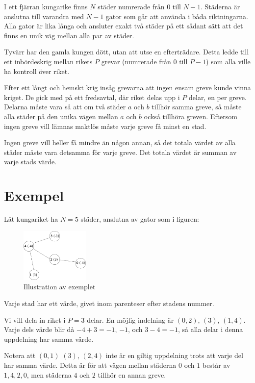 \newcommand\version{v2}
I ett fjärran kungarike finns $N$ städer numrerade från $0$ till $N-1$.
Städerna är anslutna till varandra med $N-1$ gator som går att använda i båda riktningarna.
Alla gator är lika långa och ansluter exakt två städer på ett sådant sätt att det finns en unik väg mellan alla par av städer.

Tyvärr har den gamla kungen dött, utan att utse en efterträdare. Detta ledde till ett inbördeskrig mellan rikets $P$ grevar (numrerade från $0$ till $P - 1$) som alla ville ha kontroll över riket.

Efter ett långt och hemskt krig insåg grevarna att ingen ensam greve kunde vinna kriget. De gick med på ett fredsavtal, där riket delas upp i $P$ delar, en per greve. Delarna måste vara så att om två städer $a$ och $b$ tillhör samma greve, så måste alla städer på den unika vägen mellan $a$ och $b$ också tillhöra greven. Eftersom ingen greve vill lämnas maktlös måste varje greve få minst en stad.

Ingen greve vill heller få mindre än någon annan, så det totala värdet av alla städer måste vara detsamma för varje greve. Det totala värdet är summan av varje stads värde.

\section*{Exempel}
Låt kungariket ha $N = 5$ städer, anslutna av gator som i figuren:
\begin{figure}[h!]
  \centering
  \includegraphics[width=0.3\textwidth]{sample.png}
  \caption{Illustration av exemplet}
\end{figure}
Varje stad har ett värde, givet inom parenteser efter stadens nummer.

Vi vill dela in riket i $P = 3$ delar.
En möjlig indelning är $(0, 2)$, $(3)$, $(1, 4)$.
Varje dels värde blir då $-4 + 3 = -1$, $-1$, och $3 - 4 = -1$,
så alla delar i denna uppdelning har samma värde.

Notera att $(0, 1)$ $(3)$, $(2, 4)$ inte är en giltig uppdelning trots att varje del har samma värde.
Detta är för att vägen mellan städerna $0$ och $1$ består av $1, 4, 2, 0$, men städerna $4$ och $2$ tillhör en annan greve.

